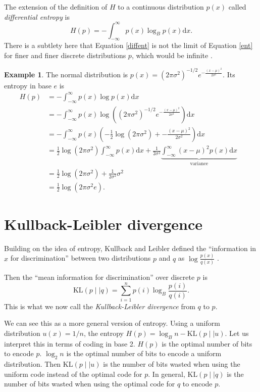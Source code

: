 \documentclass[12pt,vu]{adammath}
\newcommand\kl[2]{{\text{KL}({#1} \mid\mid {#2})}}
\theoremstyle{plain}
\theoremstyle{definition}
\newtheorem{example}[theorem]{Example}
\theoremstyle{remark}
\begin{document}
The extension of the definition of $H$ to a continuous distribution $p(x)$ called \emph{differential entropy} is
\begin{equation}\label{diffent}
H(p) = -\int_{-\infty}^{\infty} p(x) \log_B p(x) \mathrm{d}x.
\end{equation}
There is a subtlety here that Equation \ref{diffent} is not the limit of Equation \ref{ent} for finer and finer discrete distributions $p$, which would be infinite \cite{maxent}.

\begin{mybox}
\begin{example}\label{entropyexample}
The normal distribution is $p(x) = (2\pi\sigma^2)^{-1/2}e^{-\frac{(x - \mu)^2}{2\sigma^2}}$.
Its entropy in base $e$ is
\begin{align*}
H(p) &= -\int_{-\infty}^{\infty} p(x) \log p(x) \mathrm{d}x & \\
&= -\int_{-\infty}^{\infty} p(x) \log \left((2\pi\sigma^2)^{-1/2}e^{-\frac{(x - \mu)^2}{2\sigma^2}}\right) \mathrm{d}x & \\
&= -\int_{-\infty}^{\infty} p(x) \left(-\frac{1}{2} \log (2\pi\sigma^2) + -\frac{(x - \mu)^2}{2\sigma^2}\right) \mathrm{d}x & \\
&= \frac{1}{2} \log (2\pi\sigma^2) \int_{-\infty}^{\infty} p(x) \mathrm{d}x + \frac{1}{2\sigma^2} \underbrace{\int_{-\infty}^{\infty} (x - \mu)^2 p(x) \mathrm{d}x}_{\text{variance}} & \\
&= \frac{1}{2} \log (2\pi\sigma^2) + \frac{1}{2\sigma^2} \sigma^2 & \\
&= \frac{1}{2} \log (2\pi\sigma^2 e). &
\end{align*}
\end{example}
\end{mybox}

\section{Kullback-Leibler divergence}\label{kldivergence}
Building on the idea of entropy, Kullback and Leibler defined the ``information in $x$ for discrimination'' between two distributions $p$ and $q$ as $\log \frac{p(x)}{q(x)}$ \cite{kullback}.

Then the ``mean information for discrimination'' over discrete $p$ is
$$\kl{p}{q} = \sum_{i=1}^n p(i) \log_B \frac{p(i)}{q(i)}.$$
This is what we now call the \emph{Kullback-Leibler divergence} from $q$ to $p$.

We can see this as a more general version of entropy.
Using a uniform distribution $u(x) = 1/n$, the entropy $H(p) = \log_B n - \kl{p}{u}$.
Let us interpret this in terms of coding in base 2.
$H(p)$ is the optimal number of bits to encode $p$.
$\log_2 n$ is the optimal number of bits to encode a uniform distribution.
Then $\kl{p}{u}$ is the number of bits wasted when using the uniform code instead of the optimal code for $p$.
In general, $\kl{p}{q}$ is the number of bits wasted when using the optimal code for $q$ to encode $p$.
\end{document}
